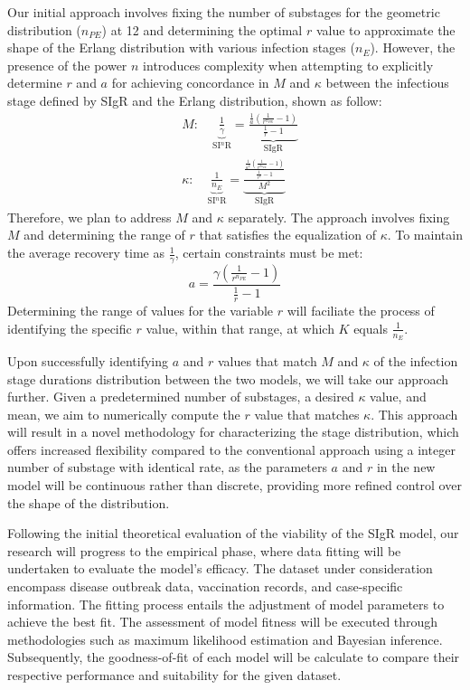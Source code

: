 \documentclass[12pt]{article}
\providecommand{\DIFaddbegin}{} %
\providecommand{\DIFaddend}{} %
\providecommand{\DIFdelbegin}{} %
\providecommand{\DIFdelend}{} %
\begin{document}
\DIFaddend Our initial approach involves fixing the number of substages for the geometric distribution ($n_{PE}$) at 12 and determining the optimal $r$ value to approximate the shape of the Erlang distribution with various infection stages ($n_E$). However, the presence of the power $n$ introduces complexity when attempting to explicitly determine $r$ and $a$ for achieving concordance in $M$ and $\kappa$ between the infectious stage defined by SIgR and the Erlang distribution, shown as follow: 
\begin{align*}
    &M: \quad \underbrace{\frac{1}{\gamma}}_{\text{SI$^n$R}} = \underbrace{\frac{\frac{1}{a} (\frac{1}{r^{n_{PE}}}-1)}{\frac{1}{r}-1}}_{\text{SIgR}} \\
    &\kappa: \quad \underbrace{\frac{1}{n_E}}_{\text{SI$^n$R}} = \underbrace{\frac{\frac{\frac{1}{a^2} (\frac{1}{r^{2n_{PE}}}-1)}{\frac{1}{r^2}-1}}{M^2}}_{\text{SIgR}}
\end{align*}
Therefore, we plan to address $M$ and $\kappa$ separately. The approach involves fixing $M$ and determining the range of $r$ that satisfies the equalization of $\kappa$. To maintain the average recovery time as $\frac{1}{\gamma}$, certain constraints must be met: 
\begin{equation*}
    a = \frac{\gamma (\frac{1}{r^{n_{PE}}}-1)}{\frac{1}{r}-1}
\end{equation*}
Determining the range of values for the variable $r$ will faciliate the process of identifying the specific $r$ value, within that range, at which $K$ equals $\frac{1}{n_E}$.

\DIFdelbegin %
\DIFdelend Upon successfully identifying $a$ and $r$ values that match $M$ and $\kappa$ of the infection stage durations distribution between the two models, we will take our approach further. Given a predetermined number of substages, a desired $\kappa$ value, and mean, we aim to numerically compute the $r$ value that matches $\kappa$. This approach will result in a novel methodology for characterizing the stage distribution, which offers increased flexibility compared to the conventional approach using a integer number of substage with identical rate, as the parameters $a$ and $r$ in the new model will be continuous rather than discrete, providing more refined control over the shape of the distribution.
\DIFdelbegin %
\DIFdelend \DIFaddbegin 

\DIFaddend Following the initial theoretical evaluation of the viability of the SIgR model, our research will progress to the empirical phase, where data fitting will be undertaken to evaluate the model's efficacy. The dataset under consideration encompass disease outbreak data, vaccination records, and case-specific information. The fitting process entails the adjustment of model parameters to achieve the best fit. The assessment of model fitness will be executed through methodologies such as maximum likelihood estimation and Bayesian inference. Subsequently, the goodness-of-fit of each model will be calculate to compare their respective performance and suitability for the given dataset.
\end{document}
